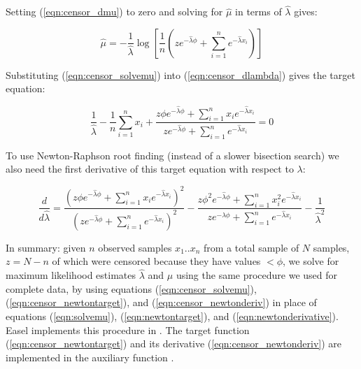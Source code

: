 Setting (\ref{eqn:censor_dmu}) to zero and solving for $\hat{\mu}$ in
terms of $\hat{\lambda}$ gives:

\begin{equation}
\hat{\mu}  =  - \frac{1}{\hat{\lambda}} 
	\log \left[ \frac{1}{n} 
	\left( z e^{-\hat{\lambda} \phi} 
               + \sum_{i=1}^{n} e^{-\hat{\lambda} x_i} \right)
	\right]
\label{eqn:censor_solvemu}
\end{equation}

Substituting (\ref{eqn:censor_solvemu}) into
(\ref{eqn:censor_dlambda}) gives the target equation:

\begin{equation}
\frac{1}{\hat{\lambda}} 
- \frac{1}{n} \sum_{i=1}^{n} x_i +
\frac{z \phi e^{-\hat{\lambda} \phi} + \sum_{i=1}^{n} x_i e^{-\hat{\lambda} x_i}} 
     {z e^{-\hat{\lambda} \phi} + \sum_{i=1}^{n} e^{-\hat{\lambda} x_i}} 
 =  0
\label{eqn:censor_newtontarget}
\end{equation}

To use Newton-Raphson root finding (instead of a slower bisection
search) we also need the first derivative of this target equation with
respect to $\lambda$:

\begin{equation}
\frac{d}{d\hat{\lambda}} = 
\frac{\left( 
        z \phi e^{-\hat{\lambda} \phi}
        + \sum_{i=1}^{n} x_i e^{-\hat{\lambda} x_i} 
       \right)^2 } 
     {\left( 
        z e^{-\hat{\lambda} \phi}
        + \sum_{i=1}^{n} e^{-\hat{\lambda} x_i}     
       \right)^2 }
-
\frac{z \phi^2 e^{-\hat{\lambda} \phi} + \sum_{i=1}^{n} x_i^2 e^{-\hat{\lambda} x_i}}
     {z  e^{-\hat{\lambda} \phi} + \sum_{i=1}^{n} e^{-\hat{\lambda} x_i}}
-
\frac{1}{\hat{\lambda}^2}
\label{eqn:censor_newtonderiv}
\end{equation}

In summary: given $n$ observed samples $x_1..x_n$ from a total sample
of $N$ samples, $z = N-n$ of which were censored because they have
values $< \phi$, we solve for maximum likelihood estimates
$\hat{\lambda}$ and $\hat{\mu}$ using the same procedure we used for
complete data, by using equations (\ref{eqn:censor_solvemu}),
(\ref{eqn:censor_newtontarget}), and (\ref{eqn:censor_newtonderiv}) in
place of equations (\ref{eqn:solvemu}), (\ref{eqn:newtontarget}), and
(\ref{eqn:newtonderivative}). Easel implements this procedure in
.  The target function
(\ref{eqn:censor_newtontarget}) and its derivative
(\ref{eqn:censor_newtonderiv}) are implemented in the auxiliary
function  \citep{Lawless82}.

